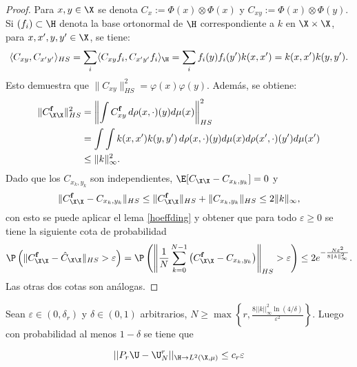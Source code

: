 \begin{proof}
	Para \( x, y \in \X \) se denota \( C_x := \Phi(x) \otimes \Phi(x) \) y \( C_{xy} := \Phi(x) \otimes \Phi(y) \). Si \( (f_i) \subset \H \) denota la base ortonormal de \( \H \) correspondiente a \( k \) en \( \X \times \X \), para \( x, x', y, y' \in \X \), se tiene:
\[
\langle C_{xy}, C_{x'y'} \rangle_{HS} = \sum_i \langle C_{xy} f_i, C_{x'y'} f_i \rangle_{\H} = \sum_i f_i(y) f_i(y') k(x, x') = k(x, x') k(y, y').
\]
Esto demuestra que \( \|C_{xy}\|^2_{HS} = \varphi(x)\varphi(y) \). Además, se obtiene:
\begin{equation*}
	\begin{aligned}
		\|C^{\mathbf{f}}_{\X \X}\|^2_{HS} &= \left\|\int C^{\mathbf{f}}_{xy} \, d \rho (x, \cdot)(y) d \mu(x) \right\|^2_{HS} \\ 
		&= \int \int k(x, x') k(y, y') \, d \rho (x, \cdot)(y) d \mu(x) d \rho (x', \cdot)(y') d \mu(x') \\
		&\leq \|k\|^2_\infty.
	\end{aligned}
\end{equation*}
Dado que los \( C_{x_k, y_k} \) son independientes, \( \E[C_{\X \X} - C_{x_k, y_k}] = 0 \) y 
\[
\|C_{\X \X}^{\mathbf{f}} - C_{x_k, y_k}\|_{HS} \leq \|C_{\X \X}^{\mathbf{f}} \|_{HS} + \|C_{x_k, y_k}\|_{HS} \leq 2\|k\|_\infty,
\]
con esto se puede aplicar el lema \ref{hoeffding} y obtener que para todo $\varepsilon \geq 0$ se tiene la siguiente cota de probabilidad
\[
\P \left( \|C_{\X \X}^{\mathbf{f}}  - \hat{C}_{\X \X}\|_{HS} > \varepsilon \right) = \P \left( \left\|\frac{1}{N} \sum_{k=0}^{N-1} \left( C_{\X \X}^{\mathbf{f}}  - C_{x_k, y_k} \right)\right\|_{HS} > \varepsilon \right) \leq 2e^{-\frac{N\varepsilon^2}{8\|k\|_\infty^2}}.
\]
Las otras dos cotas son análogas.
\end{proof}

\begin{teo}    
    Sean $\varepsilon \in (0, \delta_r)$ y $\delta \in (0, 1)$ arbitrarios, $N \geq \max \left \{ r, \frac{8 || k ||_\infty^2 \ln (4/\delta)}{\varepsilon^2} \right \}$. Luego con probabilidad al menos $1 - \delta$ se tiene que 
    
    \begin{equation*}
        || P_r\U - \U_N^r ||_{\H \to L^2(\X, \mu)} \leq c_r \varepsilon
    \end{equation*}
\end{teo}

